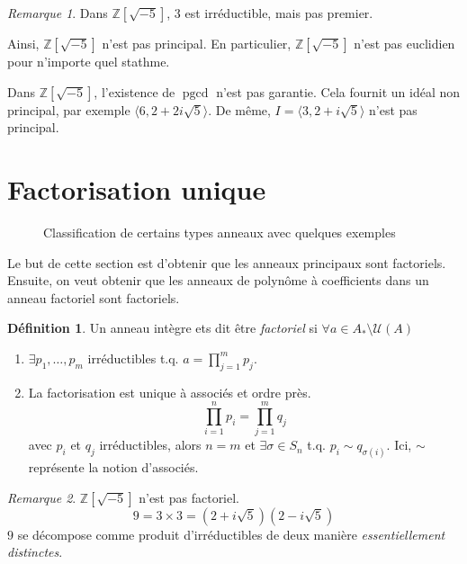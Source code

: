 \documentclass{report}
\theoremstyle{definition}
\newtheorem*{dfn}{D\'efinition}
\theoremstyle{remark}
\newtheorem*{rmq}{Remarque}
\def\ZZ{\mathbb{Z}}
\def\pgcd{\operatorname{pgcd}}
\begin{document}
	\begin{rmq}
		Dans $\ZZ[\sqrt{-5}]$, $3$ est irr\'eductible, mais pas premier.

		Ainsi, $\ZZ[\sqrt{-5}]$ n'est pas principal. En particulier, $\ZZ[\sqrt{-5}]$ n'est pas euclidien pour n'importe quel stathme.

		Dans $\ZZ[\sqrt{-5}]$, l'existence de $\pgcd$ n'est pas garantie. Cela fournit un id\'eal non principal, par exemple $\langle 6, 2+2i\sqrt{5}\rangle$. De m\^eme, $I=\langle 3, 2+i\sqrt{5} \rangle$ n'est pas principal.
	\end{rmq}

	\section{Factorisation unique}
	\begin{figure}[h]
		\centering
		\caption{Classification de certains types anneaux avec quelques exemples}
	\end{figure}

	Le but de cette section est d'obtenir que les anneaux principaux sont factoriels. Ensuite, on veut obtenir que les anneaux de polyn\^ome \`a coefficients dans un anneau factoriel sont factoriels.

	\begin{dfn}
		Un anneau int\`egre ets dit \^etre \emph{factoriel} si $\forall a\in A_*\setminus\mathcal{U}(A)$
		\begin{enumerate}
			\item $\exists p_1,\dots,p_m$ irr\'eductibles t.q. $a=\prod_{j=1}^{m}p_j$.
			\item La factorisation est unique \`a associ\'es et ordre pr\`es.
			\[ \prod_{i=1}^{n}p_i=\prod_{j=1}^{m}q_j \]
			avec $p_i$ et $q_j$ irr\'eductibles, alors $n=m$ et $\exists\sigma\in S_n$ t.q. $p_i\sim q_{\sigma(i)}$. Ici, $\sim$ repr\'esente la notion d'associ\'es.
		\end{enumerate}
	\end{dfn}

	\begin{rmq}
		$\ZZ[\sqrt{-5}]$ n'est pas factoriel.
		\[ 9 = 3\times3 = (2+i\sqrt{5}) (2-i\sqrt{5}) \]
		$9$ se d\'ecompose comme produit d'irr\'eductibles de deux mani\`ere \emph{essentiellement distinctes}.
	\end{rmq}
\end{document}
